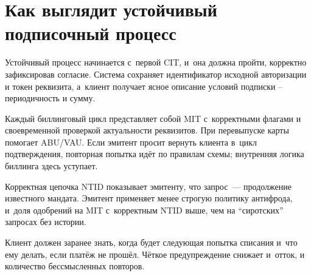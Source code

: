 \section{Как выглядит устойчивый подписочный процесс}\label{sec:subscriptions-anti-churn}

Устойчивый процесс начинается с~первой CIT, и~она должна пройти,
корректно зафиксировав согласие. Система сохраняет идентификатор
исходной авторизации и токен реквизита, а~клиент получает ясное
описание условий подписки -- периодичность и сумму.

Каждый биллинговый цикл представляет собой MIT с~корректными флагами
и своевременной проверкой актуальности реквизитов. При перевыпуске
карты помогает ABU/VAU. Если эмитент просит вернуть клиента в~цикл
подтверждения, повторная попытка идёт по правилам схемы; внутренняя
логика биллинга здесь уступает.

Корректная цепочка NTID показывает эмитенту, что запрос~---
продолжение известного мандата. Эмитент применяет менее строгую
политику антифрода, и~доля одобрений на MIT с~корректным NTID
выше, чем на \enquote{сиротских} запросах без истории.

Клиент должен заранее знать, когда будет следующая попытка списания
и~что ему делать, если платёж не прошёл. Чёткое предупреждение снижает
и~отток, и количество бессмысленных повторов.

